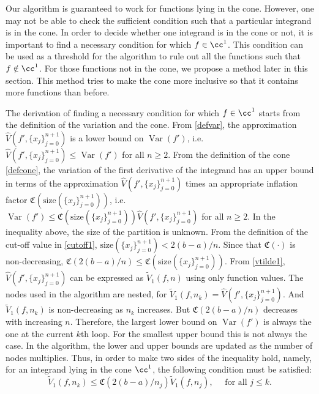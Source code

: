 \documentclass{iitthesis}
\DeclareMathOperator{\Var}{Var}
\theoremstyle{definition}
\theoremstyle{remark}
\begin{document}

Our algorithm is guaranteed to work for functions lying in the cone. However, one may not be able to check the sufficient condition such that a particular integrand is in the cone. In order to decide whether one integrand is in the cone or not, it is important to find a necessary condition for which $f\in\cc^1$. This condition can be used as a threshold for the algorithm to rule out all the functions such that $f\notin\cc^1$. For those functions not in the cone, we propose a method later in this section. This method tries to make the cone more inclusive so that it contains more functions than before.

The derivation of finding a necessary condition for which $f\in\cc^1$ starts from the definition of the variation and the cone. From \eqref{defvar}, the approximation $\widehat{V}({f'},\{x_j\}_{j=0}^{n+1})$ is a lower bound on $\Var({f'})$, i.e. $\widehat{V}({f'},\{x_j\}_{j=0}^{n+1})\leq \Var({f'})$ for all $n \ge 2$. From the definition of the cone \eqref{defcone}, the variation of the first derivative of the integrand has an upper bound in terms of the approximation $\widehat{V}({f'},\{x_j\}_{j=0}^{n+1})$ times an appropriate inflation factor $\mathfrak{C}(\text{size}(\{x_j\}_{j=0}^{n+1}))$, i.e. $\Var({f'})\leq \mathfrak{C}(\text{size}(\{x_j\}_{j=0}^{n+1}))\widehat{V}({f'},\{x_j\}_{j=0}^{n+1})$ for all $n \ge 2$.
In the inequality above, the size of the partition is unknown. From the definition of the cut-off value in \eqref{cutoff1}, $\text{size}(\{x_j\}_{j=0}^{n+1})<2(b-a)/n$. Since that $\mathfrak{C}(\cdot)$ is non-decreasing, $\mathfrak{C}(2(b-a)/n)\leq \mathfrak{C}(\text{size}(\{x_j\}_{j=0}^{n+1}))$. From \eqref{vtilde1}, $\widehat{V}({f'},\{x_j\}_{j=0}^{n+1})$ can be expressed as $\widetilde{V}_1(f,n)$ using only function values. The nodes used in the algorithm are nested, for $\widetilde{V}_1(f,n_k)=\widehat{V}({f'},\{x_j\}_{j=0}^{n+1})$. And $\widetilde{V}_1(f,n_k)$ is non-decreasing as $n_k$ increases. But $\mathfrak{C}(2(b-a)/n)$ decreases with increasing $n$. Therefore, the largest lower bound on $\Var(f')$ is always the one at the current $k$th loop. For the smallest upper bound this is not always the case. In the algorithm, the lower and upper bounds are updated as the number of nodes multiplies.
Thus, in order to make two sides of the inequality hold, namely, for an integrand lying in the cone $\cc^1$, the following condition must be satisfied:
\begin{equation}\label{neccontrap}
    \widetilde{V}_1(f,n_k)\leq\mathfrak{C}(2(b-a)/n_{j})\widetilde{V}_1(f,n_j), \quad \text{ for all } j \leq k.
\end{equation}
\end{document}
